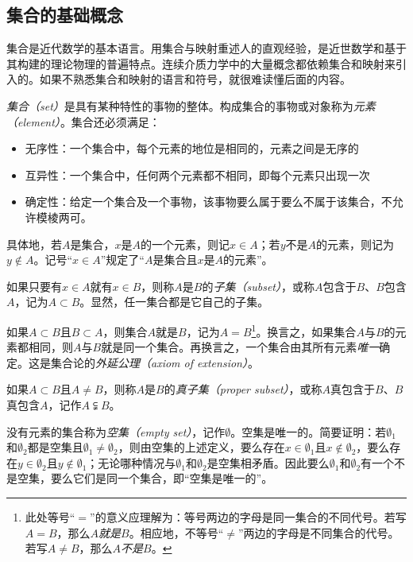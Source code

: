 \documentclass[../main.tex]{subfiles}
\begin{document}
\subsection{集合的基础概念}
集合是近代数学的基本语言。用集合与映射重述人的直观经验，是近世数学和基于其构建的理论物理的普遍特点。连续介质力学中的大量概念都依赖集合和映射来引入的。如果不熟悉集合和映射的语言和符号，就很难读懂后面的内容。

\begin{definition}\label{def:II.1.1}
\emph{集合（set）}是具有某种特性的事物的整体。构成集合的事物或对象称为\emph{元素（element）}。集合还必须满足：
\begin{itemize}
    \item 无序性：一个集合中，每个元素的地位是相同的，元素之间是无序的
    \item 互异性：一个集合中，任何两个元素都不相同，即每个元素只出现一次
    \item 确定性：给定一个集合及一个事物，该事物要么属于要么不属于该集合，不允许模棱两可。
\end{itemize}
\end{definition}

具体地，若$A$是集合，$x$是$A$的一个元素，则记$x\in A$；若$y$不是$A$的元素，则记为$y\notin A$。记号“$x\in A$”规定了“$A$是集合且$x$是$A$的元素”。

如果只要有$x\in A$就有$x\in B$，则称$A$是$B$的\emph{子集（subset）}，或称$A$包含于$B$、$B$包含$A$，记为$A\subset B$。显然，任一集合都是它自己的子集。

如果$A\subset B$且$B\subset A$，则集合$A$就是$B$，记为$A=B$\footnote{此处等号“$=$”的意义应理解为：等号两边的字母是同一集合的不同代号。若写$A=B$，那么$A$\emph{就是}$B$。相应地，不等号“$\neq$”两边的字母是不同集合的代号。若写$A\neq B$，那么$A$\emph{不是}$B$。}。换言之，如果集合$A$与$B$的元素都相同，则$A$与$B$就是同一个集合。再换言之，一个集合由其所有元素\emph{唯一}确定。这是集合论的\emph{外延公理（axiom of extension）}。

如果$A\subset B$且$A\neq B$，则称$A$是$B$的\emph{真子集（proper subset）}，或称$A$真包含于$B$、$B$真包含$A$，记作$A\subsetneqq B$。

没有元素的集合称为\emph{空集（empty set）}，记作$\emptyset$。空集是唯一的。简要证明：若$\emptyset_1$和$\emptyset_2$都是空集且$\emptyset_1\neq\emptyset_2$，则由空集的上述定义，要么存在$x\in\emptyset_1$且$x\notin\emptyset_2$，要么存在$y\in\emptyset_2$且$y\notin\emptyset_1$；无论哪种情况与$\emptyset_1$和$\emptyset_2$是空集相矛盾。因此要么$\emptyset_1$和$\emptyset_2$有一个不是空集，要么它们是同一个集合，即“空集是唯一的”。
\end{document}
